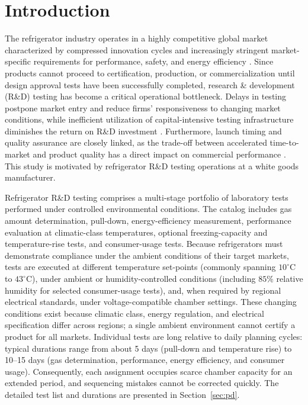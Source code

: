 \documentclass[11pt]{article}
\begin{document}
\section{Introduction}
\label{sec:intro}

The refrigerator industry operates in a highly competitive global market characterized by compressed innovation cycles and increasingly stringent market-specific requirements for performance, safety, and energy efficiency \citep{IEA2021,IEC60335-1,IEC60335-2-24,IEC62552}. Since products cannot proceed to certification, production, or commercialization until design approval tests have been successfully completed, research \& development (R\&D) testing has become a critical operational bottleneck. Delays in testing postpone market entry and reduce firms' responsiveness to changing market conditions, while inefficient utilization of capital-intensive testing infrastructure diminishes the return on R\&D investment \citep{OECD_MSTI2024,OECD_MSTI2025}. Furthermore, launch timing and quality assurance are closely linked, as the trade-off between accelerated time-to-market and product quality has a direct impact on commercial performance \citep{KimKoenigsbergOfek2022}. This study is motivated by refrigerator R\&D testing operations at a white goods manufacturer.

Refrigerator R\&D testing comprises a multi-stage portfolio of laboratory tests performed under controlled environmental conditions. The catalog includes gas amount determination, pull-down, energy-efficiency measurement, performance evaluation at climatic-class temperatures, optional freezing-capacity and temperature-rise tests, and consumer-usage tests. Because refrigerators must demonstrate compliance under the ambient conditions of their target markets, tests are executed at different temperature set-points (commonly spanning \(10^\circ\mathrm{C}\) to \(43^\circ\mathrm{C}\)), under ambient or humidity-controlled conditions (including \(85\%\) relative humidity for selected consumer-usage tests), and, when required by regional electrical standards, under voltage-compatible chamber settings. These changing conditions exist because climatic class, energy regulation, and electrical specification differ across regions; a single ambient environment cannot certify a product for all markets. Individual tests are long relative to daily planning cycles: typical durations range from about 5 days (pull-down and temperature rise) to 10--15 days (gas determination, performance, energy efficiency, and consumer usage). Consequently, each assignment occupies scarce chamber capacity for an extended period, and sequencing mistakes cannot be corrected quickly. The detailed test list and durations are presented in Section~\ref{sec:pd}.
\end{document}
